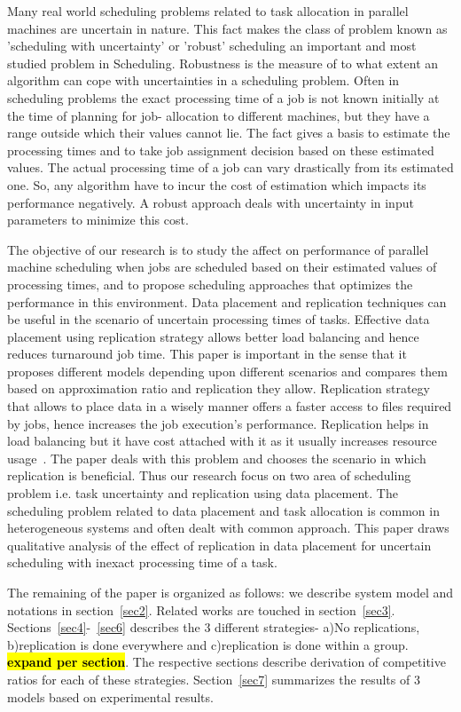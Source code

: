\documentclass[10pt, conference, compsocconf]{IEEEtran}
\newcommand{\todo}[1]{{\color{red}\textbf{\hl{#1}}\xspace}}
\begin{document}
Many real world scheduling problems related to task allocation in
parallel machines are uncertain in nature. This fact makes the class
of problem known as 'scheduling with uncertainty' or 'robust'
scheduling an important and most studied problem in
Scheduling. Robustness is the measure of to what extent an algorithm
can cope with uncertainties in a scheduling problem. Often in
scheduling problems the exact processing time of a job is not known
initially at the time of planning for job- allocation to different
machines, but they have a range outside which their values cannot
lie. The fact gives a basis to estimate the processing times and to
take job assignment decision based on these estimated values. The
actual processing time of a job can vary drastically from its
estimated one. So, any algorithm have to incur the cost of estimation
which impacts its performance negatively. A robust approach deals with
uncertainty in input parameters to minimize this cost.


The objective of our research is to study the affect on performance of
parallel machine scheduling when jobs are scheduled based on their
estimated values of processing times, and to propose scheduling
approaches that optimizes the performance in this environment. Data
placement and replication techniques can be useful in the scenario of
uncertain processing times of tasks. Effective data placement using
replication strategy allows better load balancing and hence reduces
turnaround job time. This paper is important in the sense that it
proposes different models depending upon different scenarios and
compares them based on approximation ratio and replication they
allow. Replication strategy that allows to place data in a wisely
manner offers a faster access to files required by jobs, hence
increases the job execution's performance. Replication helps in load
balancing but it have cost attached with it as it usually increases
resource usage~\cite{DBLP:journals/corr/WangJW14}. The paper deals
with this problem and chooses the scenario in which replication is
beneficial. Thus our research focus on two area of scheduling problem
i.e. task uncertainty and replication using data placement. The
scheduling problem related to data placement and task allocation is
common in heterogeneous systems and often dealt with common
approach. This paper draws qualitative analysis of the effect of
replication in data placement for uncertain scheduling with inexact
processing time of a task.

The remaining of the paper is organized as follows: we describe system
model and notations in section~\ref{sec2}. Related works are touched
in section~\ref{sec3}.  Sections~\ref{sec4}-~\ref{sec6} describes the
3 different strategies- a)No replications, b)replication is done
everywhere and c)replication is done within a group. \todo{expand per
  section}. The respective sections describe derivation of competitive
ratios for each of these strategies. Section~\ref{sec7} summarizes the
results of 3 models based on experimental results.
\end{document}

